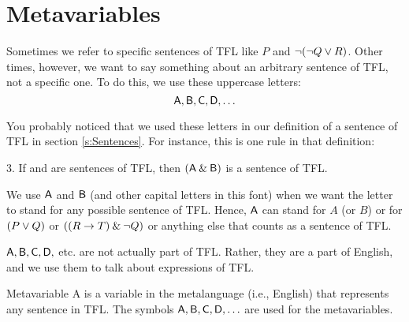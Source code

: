 \begin{comment}
Whenever we want to talk, in English, about some specific expression of TFL, we need to indicate that we are \textit{mentioning} the expression, rather than \textit{using} it. We can do this by using single quotation marks or italics (although italics are also sometimes used simply for emphasis and not to indicate that we are mentioning a term or sentence). In this textbook, we will also indicate that we are mentioning an expression by placing it centered on the page like this:
\vspace{-2mm}
$$\enot(\enot Q \eor R)$$

\end{comment}


\section{Metavariables}\label{s:Metavariables}

Sometimes we refer to specific sentences of TFL like $P$ and ${\neg} ({\neg} Q \vee R)$. Other times, however, we want to say something about an arbitrary sentence of TFL, not a specific one. To do this, we use these uppercase letters:
\vspace{-2mm}
	$$\mathsf{A}, \mathsf{B}, \mathsf{C}, \mathsf{D}, \ldots$$
	
You probably noticed that we used these letters in our definition of a sentence of TFL in section \ref{s:Sentences}. For instance, this is one rule in that definition:
\begin{earg}
\item[3.] If  and  are sentences of TFL, then $(\mathsf{A}\mathbin{\&}\mathsf{B})$ is a sentence of TFL.
\end{earg}
We use $\mathsf{A}$ and $\mathsf{B}$ (and other capital letters in this font) when we want the letter to stand for any possible sentence of TFL. Hence, $\mathsf{A}$ can stand for $A$ (or $B$) or for $(P \vee Q)$ or $((R \rightarrow T) \mathbin{\&} {\neg} Q)$ or anything else that counts as a sentence of TFL. 

$\mathsf{A}, \mathsf{B}, \mathsf{C}, \mathsf{D},$ etc. are not actually part of TFL. Rather, they are a part of  English, and we use them to talk about expressions of TFL. 
	
\begin{factboxy}{Metavariable}
A  is a variable in the metalanguage (i.e., English) that represents any sentence in TFL. The symbols $\mathsf{A}, \mathsf{B}, \mathsf{C}, \mathsf{D}, \ldots$ are used for the metavariables.
\end{factboxy}

